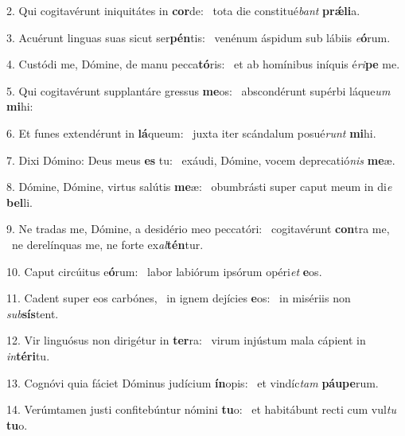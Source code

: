 2. Qui cogitavérunt iniquitátes in \textbf{cor}de: \ast\  tota die constitué\textit{bant} \textbf{prǽ}\textbf{li}a.\

3. Acuérunt linguas suas sicut ser\textbf{pén}tis: \ast\  venénum áspidum sub lábiis \textit{e}\textbf{ó}rum.\

4. Custódi me, Dómine, de manu pecca\textbf{tó}ris: \ast\  et ab homínibus iníquis é\textit{ri}\textbf{pe} me.\

5. Qui cogitavérunt supplantáre gressus \textbf{me}os: \ast\  abscondérunt supérbi láque\textit{um} \textbf{mi}hi:\

6. Et funes extendérunt in \textbf{lá}queum: \ast\  juxta iter scándalum posué\textit{runt} \textbf{mi}hi.\

7. Dixi Dómino: Deus meus \textbf{es} tu: \ast\  exáudi, Dómine, vocem deprecatió\textit{nis} \textbf{me}æ.\

8. Dómine, Dómine, virtus salútis \textbf{me}æ: \ast\  obumbrásti super caput meum in di\textit{e} \textbf{bel}li.\

9. Ne tradas me, Dómine, a desidério meo peccatóri: \dag\  cogitavérunt \textbf{con}tra me, \ast\  ne derelínquas me, ne forte ex\textit{al}\textbf{tén}tur.\

10. Caput circúitus e\textbf{ó}rum: \ast\  labor labiórum ipsórum opéri\textit{et} \textbf{e}os.\

11. Cadent super eos carbónes, \dag\  in ignem dejícies \textbf{e}os: \ast\  in misériis non \textit{sub}\textbf{sís}tent.\

12. Vir linguósus non dirigétur in \textbf{ter}ra: \ast\  virum injústum mala cápient in \textit{in}\textbf{tér}\textbf{i}tu.\

13. Cognóvi quia fáciet Dóminus judícium \textbf{ín}opis: \ast\  et vindíc\textit{tam} \textbf{páu}\textbf{pe}rum.\

14. Verúmtamen justi confitebúntur nómini \textbf{tu}o: \ast\  et habitábunt recti cum vul\textit{tu} \textbf{tu}o.\


